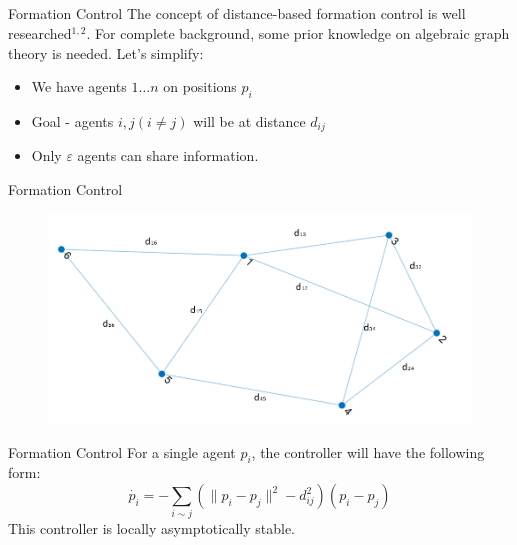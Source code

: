 \documentclass[t]{beamer}
\newcommand{\norm}[1]{\lVert #1 \rVert}
\begin{document}
\subsection[Distance-Based Formation Control]{}
\begin{frame}[label=distanceformation1]{Formation Control}
The concept of distance-based formation control is well researched$^{1,2}$.
For complete background, some prior knowledge on algebraic graph theory is needed. Let's simplify:
\begin{itemize}
\item We have agents $1 \ldots n$ on positions $p_{i}$ \pause
\item Goal - agents $i,j (i \neq j)$ will be at distance $d_{ij}$ \pause
\item Only $\varepsilon$ agents can share information.
\end{itemize}

\end{frame}
\begin{frame}[label=distanceformation2]{Formation Control}
\begin{figure}[t!]
\centering
\includegraphics[scale=0.42]{graph-example.png}
\end{figure}
\end{frame}

\begin{frame}[label=distanceformation3]{Formation Control}
For a single agent $p_i$, the controller will have the following form:
\begin{equation}
    \dot{p_{i}} = -\sum_{i \sim j} \left( \norm{p_{i} - p_{j}}^{2} - d_{ij}^2 \right) \left( p_{i} - p_{j} \right)
    \label{formation controller}
\end{equation}
This controller is locally asymptotically stable.
\end{frame}
\end{document}
